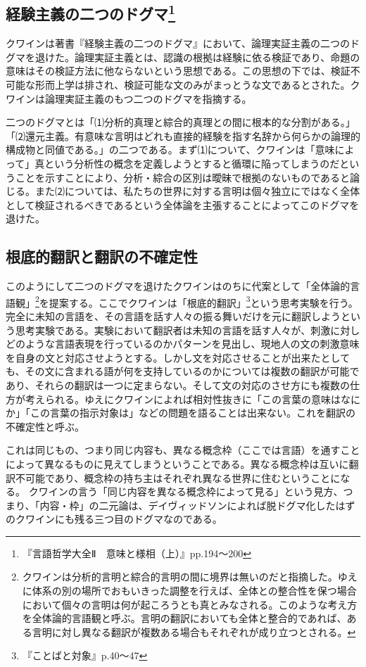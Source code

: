 \documentclass[b5j,twoside,twocolumn]{utarticle}
\begin{document}
\subsection*{経験主義の二つのドグマ\footnote{『言語哲学大全Ⅱ　意味と様相（上）』pp.194〜200}}
クワインは著書『経験主義の二つのドグマ』において、論理実証主義の二つのドグマを退けた。論理実証主義とは、認識の根拠は経験に依る検証であり、命題の意味はその検証方法に他ならないという思想である。この思想の下では、検証不可能な形而上学は排され、検証可能な文のみがまっとうな文であるとされた。クワインは論理実証主義のもつ二つのドグマを指摘する。


二つのドグマとは「⑴分析的真理と綜合的真理との間に根本的な分割がある。」「⑵還元主義。有意味な言明はどれも直接的経験を指す名辞から何らかの論理的構成物と同値である。」の二つである。まず⑴について、クワインは「意味によって」真という分析性の概念を定義しようとすると循環に陥ってしまうのだということを示すことにより、分析・綜合の区別は曖昧で根拠のないものであると論じる。また⑵については、私たちの世界に対する言明は個々独立にではなく全体として検証されるべきであるという全体論を主張することによってこのドグマを退けた。
\subsection*{根底的翻訳と翻訳の不確定性}
このようにして二つのドグマを退けたクワインはのちに代案として「全体論的言語観」\footnote{クワインは分析的言明と綜合的言明の間に境界は無いのだと指摘した。ゆえに体系の別の場所でおもいきった調整を行えば、全体との整合性を保つ場合において個々の言明は何が起ころうとも真とみなされる。このような考え方を全体論的言語観と呼ぶ。言明の翻訳においても全体と整合的であれば、ある言明に対し異なる翻訳が複数ある場合もそれぞれが成り立つとされる。}を提案する。ここでクワインは「根底的翻訳」\footnote{ 『ことばと対象』p.40〜47}という思考実験を行う。完全に未知の言語を、その言語を話す人々の振る舞いだけを元に翻訳しようという思考実験である。実験において翻訳者は未知の言語を話す人々が、刺激に対しどのような言語表現を行っているのかパターンを見出し、現地人の文の刺激意味を自身の文と対応させようとする。しかし文を対応させることが出来たとしても、その文に含まれる語が何を支持しているのかについては複数の翻訳が可能であり、それらの翻訳は一つに定まらない。そして文の対応のさせ方にも複数の仕方が考えられる。ゆえにクワインによれば相対性抜きに「この言葉の意味はなにか」「この言葉の指示対象は」などの問題を語ることは出来ない。これを翻訳の不確定性と呼ぶ。


これは同じもの、つまり同じ内容も、異なる概念枠（ここでは言語）を通すことによって異なるものに見えてしまうということである。異なる概念枠は互いに翻訳不可能であり、概念枠の持ち主はそれぞれ異なる世界に住むということになる。
クワインの言う「同じ内容を異なる概念枠によって見る」という見方、つまり、「内容・枠」の二元論は、デイヴィッドソンによれば脱ドグマ化したはずのクワインにも残る三つ目のドグマなのである。
\end{document}

